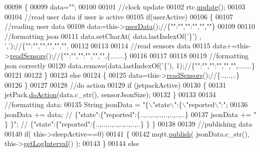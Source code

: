 \begin{DoxyCode}
00098 \{
00099     data=\textcolor{stringliteral}{""};
00100 
00101     \textcolor{comment}{//clock update}
00102     rtc.\hyperlink{class_cool_time_aae601f795452cfa48d9fb337aed483a8}{update}();
00103 
00104     \textcolor{comment}{//read user data if user is active}
00105     \textcolor{keywordflow}{if}(userActive)
00106     \{
00107         \textcolor{comment}{//reading user data}
00108         data=this->\hyperlink{class_cool_board_ae7358fb6e623cfc81b775f5f1734909b}{userData}();\textcolor{comment}{//\{"":"","":"","",""\}}
00109 
00110         \textcolor{comment}{//formatting json }
00111         data.setCharAt( data.lastIndexOf(\textcolor{charliteral}{'\}'}) , \textcolor{charliteral}{','});\textcolor{comment}{//\{"":"","":"","","",}
00112         
00113                 
00114         \textcolor{comment}{//read sensors data}
00115         data+=this->\hyperlink{class_cool_board_ad03abdce2e65f520bbf2cff0f2d083cf}{readSensors}();\textcolor{comment}{//\{"":"","":"","","",\{.......\}}
00116 
00117         
00118 
00119         \textcolor{comment}{//formatting json correctly}
00120         data.remove(data.lastIndexOf(\textcolor{charliteral}{'\{'}), 1);\textcolor{comment}{//\{"":"","":"","","",.......\}}
00121                 
00122     \}   
00123     \textcolor{keywordflow}{else}
00124     \{
00125         data=this->\hyperlink{class_cool_board_ad03abdce2e65f520bbf2cff0f2d083cf}{readSensors}();\textcolor{comment}{//\{..,..,..\}}
00126     \}
00127     
00128     \textcolor{comment}{//do action}
00129     \textcolor{keywordflow}{if} (jetpackActive)
00130     \{
00131         jetPack.\hyperlink{class_jetpack_a86d2e83436ef4b85f4c3a6e85ac785b0}{doAction}(data.c\_str(), sensorJsonSize);
00132     \}
00133     
00134     \textcolor{comment}{//formatting data:}
00135     String jsonData = \textcolor{stringliteral}{"\{\(\backslash\)"state\(\backslash\)":\{\(\backslash\)"reported\(\backslash\)":"};
00136     jsonData += data; \textcolor{comment}{// \{"state":\{"reported":\{..,..,..,..,..,..,..,..\}}
00137     jsonData += \textcolor{stringliteral}{" \} \}"}; \textcolor{comment}{// \{"state":\{"reported":\{..,..,..,..,..,..,..,..\}  \} \}}
00138     
00139     \textcolor{comment}{//publishing data   }
00140     \textcolor{keywordflow}{if}( this->sleepActive==0)   
00141     \{
00142         mqtt.\hyperlink{class_cool_m_q_t_t_ace977b3e90ab14b1199fe5c4fb0a13ec}{publish}( jsonData.c\_str(), this->\hyperlink{class_cool_board_aaa24480b273fc095a1356a589c333781}{getLogInterval}() );
00143     \}
00144     \textcolor{keywordflow}{else}

\end{DoxyCode}
